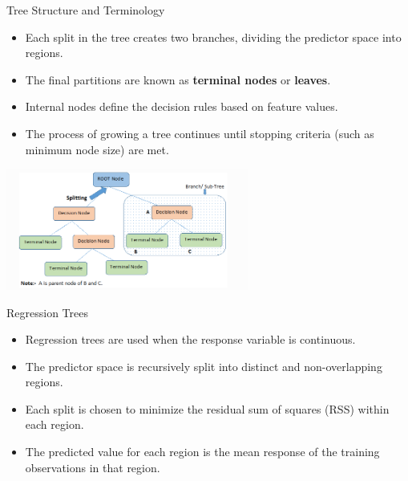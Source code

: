 \documentclass[aspectratio=169,xcolor=dvipsnames]{beamer}
\begin{document}
\begin{frame}{Tree Structure and Terminology}
    \begin{itemize}
        \item Each split in the tree creates two branches, dividing the predictor space into regions.
        \item The final partitions are known as \textbf{terminal nodes} or \textbf{leaves}.
        \item Internal nodes define the decision rules based on feature values.
        \item The process of growing a tree continues until stopping criteria (such as minimum node size) are met.
    \end{itemize}
    \centering
    \includegraphics[width=0.6\textwidth]{images/terminology.png}
\end{frame}


\begin{frame}{Regression Trees}
    \begin{itemize}
        	\setlength\itemsep{0.5cm}
        \item Regression trees are used when the response variable is continuous.
        \item The predictor space is recursively split into distinct and non-overlapping regions.
        \item Each split is chosen to minimize the residual sum of squares (RSS) within each region.
        \item The predicted value for each region is the mean response of the training observations in that region.    \end{itemize}
    \begin{center}
    \end{center}
\end{frame}
\end{document}
